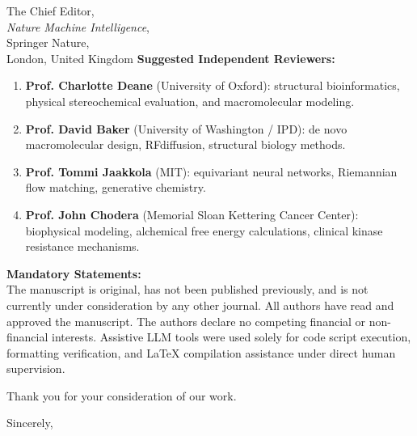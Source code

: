 \documentclass[11pt]{letter}
\begin{document}
\begin{letter}{%
    The Chief Editor,\\
    \textit{Nature Machine Intelligence},\\
    Springer Nature,\\
    London, United Kingdom
}
\textbf{Suggested Independent Reviewers:}
\begin{enumerate}
    \item \textbf{Prof. Charlotte Deane} (University of Oxford): structural bioinformatics, physical stereochemical evaluation, and macromolecular modeling.
    \item \textbf{Prof. David Baker} (University of Washington / IPD): de novo macromolecular design, RFdiffusion, structural biology methods.
    \item \textbf{Prof. Tommi Jaakkola} (MIT): equivariant neural networks, Riemannian flow matching, generative chemistry.
    \item \textbf{Prof. John Chodera} (Memorial Sloan Kettering Cancer Center): biophysical modeling, alchemical free energy calculations, clinical kinase resistance mechanisms.
\end{enumerate}

\textbf{Mandatory Statements:}\\
The manuscript is original, has not been published previously, and is not currently under consideration by any other journal. All authors have read and approved the manuscript. The authors declare no competing financial or non-financial interests. Assistive LLM tools were used solely for code script execution, formatting verification, and LaTeX compilation assistance under direct human supervision.

Thank you for your consideration of our work.

\closing{Sincerely,}


\end{letter}
\end{document}
